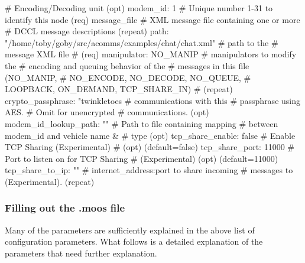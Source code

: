 \documentclass[11pt, letterpaper, oneside]{memoir}
\begin{document}
\begin{boxedverbatim}
{{              # Encoding/Decoding unit (opt)
    modem_id: 1  # Unique number 1-31 to identify this node (req)
    message_file {  # XML message file containing one or more 
                    # DCCL message descriptions (repeat)
      path: "/home/toby/goby/src/acomms/examples/chat/chat.xml"  
                                              # path to the 
                                              # message XML file 
                                              # (req)
      manipulator: NO_MANIP  # manipulators to modify the 
                             # encoding and queuing behavior of the 
                             # messages in this file (NO_MANIP, 
                             # NO_ENCODE, NO_DECODE, NO_QUEUE, 
                             # LOOPBACK, ON_DEMAND, TCP_SHARE_IN) 
                             # (repeat)
    }
    crypto_passphrase: "twinkletoes%
                                         # communications with this 
                                         # passphrase using AES. 
                                         # Omit for unencrypted 
                                         # communications. (opt)
  }
  modem_id_lookup_path: ""  # Path to file containing mapping 
                            # between modem_id and vehicle name & 
                            # type (opt)
  tcp_share_enable: false  # Enable TCP Sharing (Experimental) 
                           # (opt) (default=false)
  tcp_share_port: 11000  # Port to listen on for TCP Sharing 
                         # (Experimental) (opt) (default=11000)
  tcp_share_to_ip: ""  # internet_address:port to share incoming 
                       # messages to (Experimental). (repeat)
}

\end{boxedverbatim}%
\resetbvlinenumber

\subsubsection{Filling out the .moos file}

Many of the parameters are sufficiently explained in the above list of configuration parameters. What follows is a detailed explanation of the parameters that need further explanation.
\end{document}
